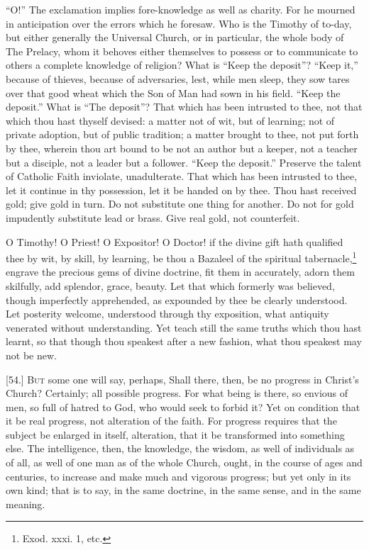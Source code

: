 “O!” The exclamation implies fore-knowledge as well as charity. For he mourned in anticipation over the errors which he foresaw. Who is the Timothy of to-day, but either generally the Universal Church, or in particular, the whole body of The Prelacy, whom it behoves either themselves to possess or to communicate to others a complete knowledge of religion? What is “Keep the deposit”? “Keep it,” because of thieves, because of adversaries, lest, while men sleep, they sow tares over that good wheat which the Son of Man had sown in his field. “Keep the deposit.” What is “The deposit”? That which has been intrusted to thee, not that which thou hast thyself devised: a matter not of wit, but of learning; not of private adoption, but of public tradition; a matter brought to thee, not put forth by thee, wherein thou art bound to be not an author but a keeper, not a teacher but a disciple, not a leader but a follower. “Keep the deposit.” Preserve the talent of Catholic Faith inviolate, unadulterate. That which has been intrusted to thee, let it continue in thy possession, let it be handed on by thee. Thou hast received gold; give gold in turn. Do not substitute one thing for another. Do not for gold impudently substitute lead or brass. Give real gold, not counterfeit.

O Timothy! O Priest! O Expositor! O Doctor! if the divine gift hath qualified thee by wit, by skill, by learning, be thou a Bazaleel of the spiritual tabernacle,\footnote{Exod. xxxi. 1, etc.} engrave the precious gems of divine doctrine, fit them in accurately, adorn them skilfully, add splendor, grace, beauty. Let that which formerly was believed, though imperfectly apprehended, as expounded by thee be clearly understood. Let posterity welcome, understood through thy exposition, what antiquity venerated without understanding. Yet teach still the same truths which thou hast learnt, so that though thou speakest after a new fashion, what thou speakest may not be new.


[54.] \textsc{But} some one will say, perhaps, Shall there, then, be no progress in Christ’s Church? Certainly; all possible progress. For what being is there, so envious of men, so full of hatred to God, who would seek to forbid it? Yet on condition that it be real progress, not alteration of the faith. For progress requires that the subject be enlarged in itself, alteration, that it be transformed into something else. The intelligence, then, the knowledge, the wisdom, as well of individuals as of all, as well of one man as of the whole Church, ought, in the course of ages and centuries, to increase and make much and vigorous progress; but yet only in its own kind; that is to say, in the same doctrine, in the same sense, and in the same meaning.

